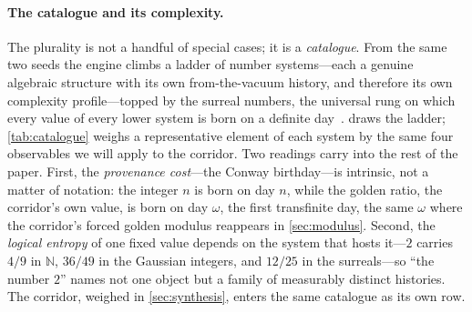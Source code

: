 \documentclass[11pt,letterpaper]{article}
\theoremstyle{plain}
\theoremstyle{definition}
\theoremstyle{remark}
\newcommand{\NN}{\mathbb{N}}
\begin{document}
\paragraph{The catalogue and its complexity.}
The plurality is not a handful of special cases; it is a \emph{catalogue}. From the
same two seeds the engine climbs a ladder of number systems---each a genuine
algebraic structure with its own from-the-vacuum history, and therefore its own
complexity profile---topped by the surreal numbers, the universal rung on which
every value of every lower system is born on a definite day~\citep{conway2001onag,
iaom_every_number}.  draws the ladder; \cref{tab:catalogue} weighs a
representative element of each system by the same four observables we will apply to
the corridor. Two readings carry into the rest of the paper. First, the
\emph{provenance cost}---the Conway birthday---is intrinsic, not a matter of
notation: the integer $n$ is born on day $n$, while the golden ratio, the corridor's
own value, is born on day $\omega$, the first transfinite day, the same $\omega$
where the corridor's forced golden modulus reappears in \cref{sec:modulus}. Second,
the \emph{logical entropy} of one fixed value depends on the system that hosts
it---$2$ carries $4/9$ in $\NN$, $36/49$ in the Gaussian integers, and $12/25$ in
the surreals---so ``the number $2$'' names not one object but a family of measurably
distinct histories. The corridor, weighed in \cref{sec:synthesis}, enters the same
catalogue as its own row.
\end{document}
